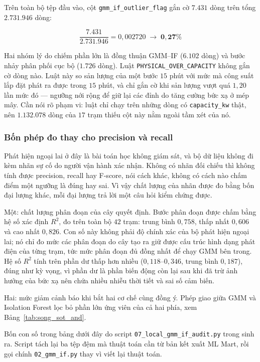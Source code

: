 \documentclass[12pt, a4paper]{report}
\begin{document}
Trên toàn bộ tệp đầu vào, cột \texttt{gmm\_if\_outlier\_flag} gắn cờ $\mathbf{7.431}$ dòng trên
tổng $\mathbf{2.731.946}$ dòng:

\begin{equation}
\frac{7.431}{2.731.946} = 0{,}002720 \;\longrightarrow\; \mathbf{0{,}27\%}
\end{equation}

Hai nhóm lý do chiếm phần lớn là đồng thuận GMM--IF ($6.102$ dòng) và bước nhảy phân phối cục bộ ($1.726$ dòng). Luật \texttt{PHYSICAL\_OVER\_CAPACITY} không gắn cờ dòng nào. Luật này so sản lượng của một
bước $15$ phút với mức mà công suất lắp đặt phát ra được trong $15$ phút, và chỉ gắn cờ khi
sản lượng vượt quá $1{,}20$ lần mức đó --- ngưỡng nới rộng để giữ lại các đỉnh do tăng cường
bức xạ ở mép mây. Cần nói rõ phạm vi: luật chỉ chạy trên những dòng có \texttt{capacity\_kw}
thật, nên $1.132.078$ dòng của $17$ trạm thiếu cột này nằm ngoài tầm xét của nó.

\subsubsection{Bốn phép đo thay cho precision và recall}

Phát hiện ngoại lai ở đây là bài toán học không giám sát, và bộ dữ liệu không đi
kèm nhãn sự cố do người vận hành xác nhận. Không có nhãn đối chiếu thì không tính được
precision, recall hay F-score, nói cách khác, không có cách nào chấm điểm một ngưỡng là
đúng hay sai. Vì vậy chất lượng của nhãn được đo bằng bốn đại lượng khác, mỗi đại lượng trả
lời một câu hỏi kiểm chứng được.

Một: chất lượng phân đoạn của cây quyết định. Bước phân đoạn được chấm bằng hệ
số xác định $R^2$, đo trên toàn bộ $42$ trạm: trung bình $0{,}758$, thấp nhất
$0{,}606$ và cao nhất $0{,}826$. Con số này không phải độ chính xác của bộ phát
hiện ngoại lai; nó chỉ đo mức các phân đoạn do cây tạo ra giữ được cấu trúc hình dạng phát
điện của từng trạm, tức mức phân đoạn đủ đồng nhất để chạy GMM bên trong. Hệ số $R^2$ tính
trên phần dư thấp hơn nhiều ($0{,}118$--$0{,}346$, trung bình $0{,}187$), đúng như kỳ vọng,
vì phần dư là phần biến động còn lại sau khi đã trừ ảnh hưởng của bức xạ nên chứa nhiều
nhiễu thời tiết và sai số cảm biến.

Hai: mức giảm cảnh báo khi bắt hai cơ chế cùng đồng ý. Phép giao giữa GMM và
Isolation Forest lọc bỏ phần lớn ứng viên của cả hai phía, xem Bảng~\ref{tab:song_sot_and}.

Bốn con số trong bảng dưới đây do script
\texttt{07\_local\_gmm\_if\_audit.py} trong 
sinh ra. Script tách lại ba tệp đệm mà thuật toán cần từ bản kết xuất ML Mart, rồi gọi chính
\texttt{02\_gmm\_if.py} thay vì viết lại thuật toán.
\end{document}
